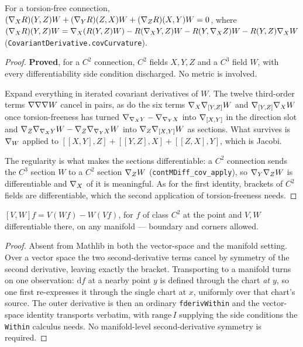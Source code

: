\begin{lemma}
  \label{lem:bianchi-second}
  \leanok
  For a torsion-free connection,
  $(\nabla_X R)(Y,Z)W + (\nabla_Y R)(Z,X)W + (\nabla_Z R)(X,Y)W = 0$,
  where $(\nabla_X R)(Y,Z)W = \nabla_X(R(Y,Z)W) - R(\nabla_X Y, Z)W
  - R(Y, \nabla_X Z)W - R(Y,Z)\nabla_X W$
  (\texttt{CovariantDerivative.covCurvature}).
\end{lemma}

\begin{proof}
  \leanok
  \textbf{Proved}, for a $C^2$ connection, $C^2$ fields $X, Y, Z$ and a $C^3$
  field $W$, with every differentiability side condition discharged. No metric
  is involved.

  Expand everything in iterated covariant derivatives of $W$. The twelve
  third-order terms $\nabla\nabla\nabla W$ cancel in pairs, as do the six terms
  $\nabla_X \nabla_{[Y,Z]} W$ and $\nabla_{[Y,Z]} \nabla_X W$ once torsion-freeness has
  turned $\nabla_{\nabla_X Y} - \nabla_{\nabla_Y X}$ into $\nabla_{[X,Y]}$ in the
  direction slot and $\nabla_Z \nabla_{\nabla_X Y} W - \nabla_Z \nabla_{\nabla_Y X} W$
  into $\nabla_Z \nabla_{[X,Y]} W$ as sections. What survives is
  $\nabla_W$ applied to $[[X,Y],Z] + [[Y,Z],X] + [[Z,X],Y]$, which is Jacobi.

  The regularity is what makes the sections differentiable: a $C^2$
  connection sends the $C^3$ section $W$ to a $C^2$ section $\nabla_Z W$
  (\texttt{contMDiff\_cov\_apply}), so $\nabla_Y \nabla_Z W$ is differentiable and
  $\nabla_X$ of it is meaningful. As for the first identity, brackets of $C^2$
  fields are differentiable, which the second application of torsion-freeness
  needs.
\end{proof}

\begin{lemma}
  \label{lem:derivation}
  \leanok
  $[V,W]f = V(Wf) - W(Vf)$, for $f$ of class $C^2$ at the point and $V,W$
  differentiable there, on any manifold --- boundary and corners allowed.
\end{lemma}

\begin{proof}
  \leanok
  Absent from Mathlib in both the vector-space and the manifold setting. Over a
  vector space the two second-derivative terms cancel by symmetry of the second
  derivative, leaving exactly the bracket. Transporting to a manifold turns on one
  observation: $\mathrm{d}f$ at a nearby point $y$ is defined through the chart
  \emph{at $y$}, so one first re-expresses it through the single chart at $x$,
  uniformly over that chart's source. The outer derivative is then an ordinary
  \texttt{fderivWithin} and the vector-space identity transports verbatim, with
  $\mathrm{range}\,I$ supplying the side conditions the \texttt{Within} calculus
  needs. No manifold-level second-derivative symmetry is required.
\end{proof}


